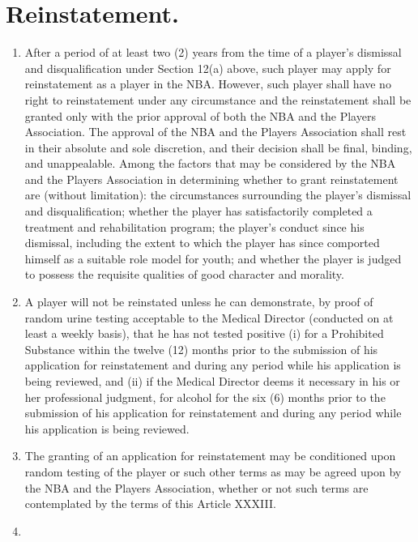 \documentclass[
]{book}
\begin{document}
\hypertarget{reinstatement.}{%
\section{Reinstatement.}\label{reinstatement.}}

\begin{enumerate}
\def\labelenumi{(\alph{enumi})}
\item
  After a period of at least two (2) years from the time of a player's dismissal and disqualification under Section 12(a) above, such player may apply for reinstatement as a player in the NBA. However, such player shall have no right to reinstatement under any circumstance and the reinstatement shall be granted only with the prior approval of both the NBA and the Players Association. The approval of the NBA and the Players Association shall rest in their absolute and sole discretion, and their decision shall be final, binding, and unappealable. Among the factors that may be considered by the NBA and the Players Association in determining whether to grant reinstatement are (without limitation): the circumstances surrounding the player's dismissal and disqualification; whether the player has satisfactorily completed a treatment and rehabilitation program; the player's conduct since his dismissal, including the extent to which the player has since comported himself as a suitable role model for youth; and whether the player is judged to possess the requisite qualities of good character and morality.
\item
  A player will not be reinstated unless he can demonstrate, by proof of random urine testing acceptable to the Medical Director (conducted on at least a weekly basis), that he has not tested positive (i) for a Prohibited Substance within the twelve (12) months prior to the submission of his application for reinstatement and during any period while his application is being reviewed, and (ii) if the Medical Director deems it necessary in his or her professional judgment, for alcohol for the six (6) months prior to the submission of his application for reinstatement and during any period while his application is being reviewed.
\item
  The granting of an application for reinstatement may be conditioned upon random testing of the player or such other terms as may be agreed upon by the NBA and the Players Association, whether or not such terms are contemplated by the terms of this Article XXXIII.
\item
  \begin{enumerate}

\end{enumerate}
\end{enumerate}
\end{document}
